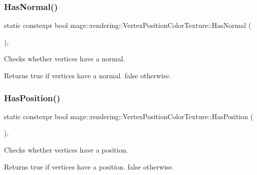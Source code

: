 \subsubsection{\texorpdfstring{Has\+Normal()}{HasNormal()}}
{\footnotesize\ttfamily static constexpr bool mage\+::rendering\+::\+Vertex\+Position\+Color\+Texture\+::\+Has\+Normal (\begin{DoxyParamCaption}{ }\end{DoxyParamCaption})\hspace{0.3cm}{\ttfamily [static]}, {\ttfamily [noexcept]}}

Checks whether vertices have a normal.

\begin{DoxyReturn}{Returns}
{\ttfamily true} if vertices have a normal. {\ttfamily false} otherwise. 
\end{DoxyReturn}
\hypertarget{structmage_1_1rendering_1_1_vertex_position_color_texture_a7e63de3d06cc4d0a9fb3f32cde764c9c}{}\label{structmage_1_1rendering_1_1_vertex_position_color_texture_a7e63de3d06cc4d0a9fb3f32cde764c9c} 
\subsubsection{\texorpdfstring{Has\+Position()}{HasPosition()}}
{\footnotesize\ttfamily static constexpr bool mage\+::rendering\+::\+Vertex\+Position\+Color\+Texture\+::\+Has\+Position (\begin{DoxyParamCaption}{ }\end{DoxyParamCaption})\hspace{0.3cm}{\ttfamily [static]}, {\ttfamily [noexcept]}}

Checks whether vertices have a position.

\begin{DoxyReturn}{Returns}
{\ttfamily true} if vertices have a position. {\ttfamily false} otherwise. 
\end{DoxyReturn}
\hypertarget{structmage_1_1rendering_1_1_vertex_position_color_texture_a679323396203b9b47a6ef4c936c72d58}{}\label{structmage_1_1rendering_1_1_vertex_position_color_texture_a679323396203b9b47a6ef4c936c72d58} 
